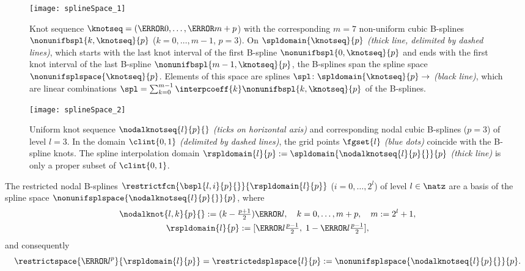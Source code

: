 \begin{figure}
  \texttt{[image: splineSpace\_1]}%
  \caption[%
    Non-uniform B-splines with knot sequence and interpolation domain%
  ]{%
    Knot sequence $\knotseq = (\knot{0}, \dotsc, \knot{m+p}$)
    with the corresponding $m = 7$ non-uniform cubic B-splines
    $\nonunifbspl{k,\knotseq}{p}$ ($k = 0, \dotsc, m - 1$, $p = 3$).
    On $\spldomain{\knotseq}{p}$ \emph{(thick line, delimited by dashed lines)},
    which starts with the last knot interval of the first B-spline
    $\nonunifbspl{0,\knotseq}{p}$
    and ends with the first knot interval of the last B-spline
    $\nonunifbspl{m-1,\knotseq}{p}$,
    the B-splines span the spline space $\nonunifsplspace{\knotseq}{p}$.
    Elements of this space are splines $\spl\colon \spldomain{\knotseq}{p} \to \real$
    \emph{(black line)},
    which are linear combinations
    $\spl = \sum_{k=0}^{m-1} \interpcoeff{k} \nonunifbspl{k,\knotseq}{p}$
    of the B-splines.%
  }%
  \label{fig:splineSpaceGeneral}%
\end{figure}

\begin{figure}
  \texttt{[image: splineSpace\_2]}%
  \caption[%
    Uniform nodal B-splines and knot sequence%
  ]{%
    Uniform knot sequence $\nodalknotseq{l}{p}{}$ \emph{(ticks on horizontal axis)}
    and corresponding nodal cubic B-splines ($p = 3$) of level $l = 3$.
    In the domain $\clint{0, 1}$ \emph{(delimited by dashed lines)},
    the grid points $\fgset{l}$ \emph{\textcolor{mittelblau}{(blue dots)}}
    coincide with the B-spline knots.
    The spline interpolation domain
    $\rspldomain{l}{p} := \spldomain{\nodalknotseq{l}{p}{}}{p}$
    \emph{(thick line)}
    is only a proper subset of $\clint{0, 1}$.%
  }%
  \label{fig:splineSpaceUniform}%
\end{figure}

\begin{corollary}
  \label{cor:nodalBSplineSpace}
  The restricted nodal B-splines $\restrictfcn{\bspl{l,i}{p}{}}{\rspldomain{l}{p}}$
  ($i = 0, \dotsc, 2^l$)
  of level $l \in \natz$ are
  a basis of the spline space $\nonunifsplspace{\nodalknotseq{l}{p}{}}{p}$,
  where
  \begin{gather}
    \label{eq:nodalBSplineSpaceKnots}
    \nodalknot{l,k}{p}{}
    := (k - \tfrac{p+1}{2}) \ms{l},\quad
    k = 0, \dotsc, m + p,\quad
    m := 2^l + 1,\\
    \rspldomain{l}{p} := [\ms{l} \tfrac{p-1}{2},\;
    1 - \ms{l} \tfrac{p-1}{2}],
  \end{gather}
  and consequently
  \begin{equation}
    \restrictspace{\ns{l}^p}{\rspldomain{l}{p}}
    = \restrictedsplspace{l}{p}
    := \nonunifsplspace{\nodalknotseq{l}{p}{}}{p}.
  \end{equation}
\end{corollary}

